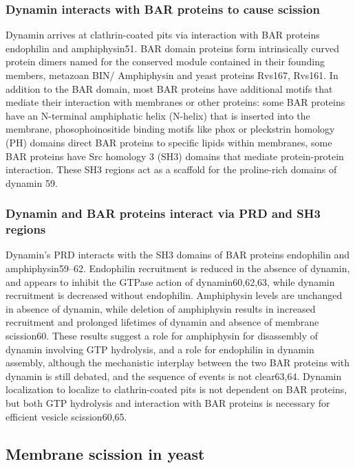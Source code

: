 		\subsubsection{Dynamin interacts with BAR proteins to cause scission}
		Dynamin arrives at clathrin-coated pits via interaction with BAR proteins endophilin and amphiphysin51. BAR domain proteins form intrinsically curved protein dimers named for the conserved module contained in their founding members, metazoan BIN/ Amphiphysin and yeast proteins Rvs167, Rvs161. In addition to the BAR domain, most BAR proteins have additional motifs that mediate their interaction with membranes or other proteins: some BAR proteins have an N-terminal amphiphatic helix (N-helix) that is inserted into the membrane, phosophoinositide binding motifs like phox or pleckstrin homology (PH) domains direct BAR proteins to specific lipids within membranes, some BAR proteins have Src homology 3 (SH3) domains that mediate protein-protein interaction. These SH3 regions act as a scaffold for the proline-rich domains of dynamin 59. 


		\subsubsection{Dynamin and BAR proteins interact via PRD and SH3 regions }
		Dynamin’s PRD interacts with the SH3 domains of BAR proteins endophilin and amphiphysin59–62. Endophilin recruitment is reduced in the absence of dynamin, and appears to inhibit the GTPase action of dynamin60,62,63, while dynamin recruitment is decreased without endophilin. Amphiphysin levels are unchanged in absence of dynamin, while deletion of amphiphysin results in increased recruitment and prolonged lifetimes of dynamin and absence of membrane scission60. These results suggest a role for amphiphysin for disassembly of dynamin involving GTP hydrolysis, and a role for endophilin in dynamin assembly, although the mechanistic interplay between the two BAR proteins with dynamin is still debated, and the sequence of events is not clear63,64. Dynamin localization to localize to clathrin-coated pits is not dependent on BAR proteins, but both GTP hydrolysis and interaction with BAR proteins is necessary for efficient vesicle scission60,65.

\label{key}

	\subsection{Membrane scission in yeast} \label {yeast_scission}
